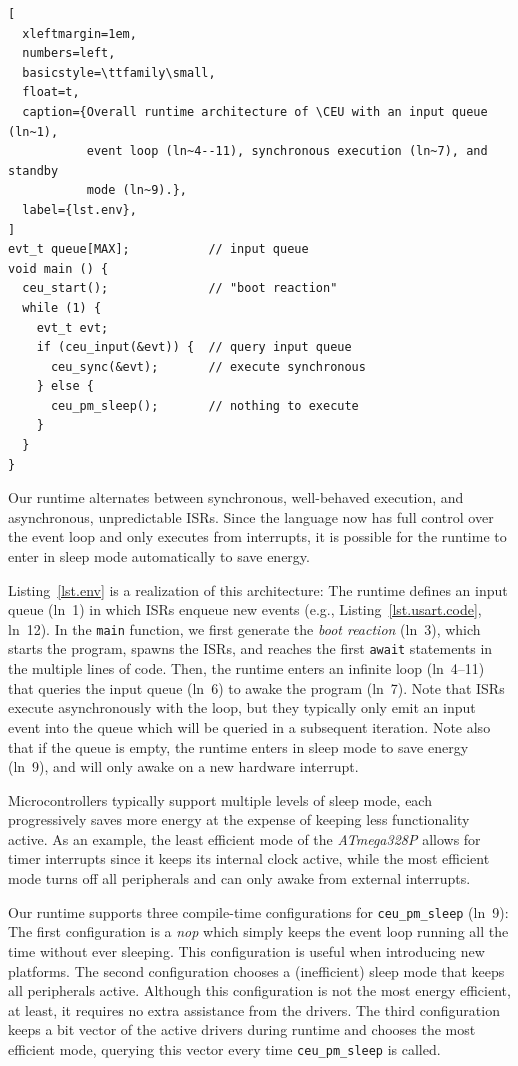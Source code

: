 \documentclass[sigplan,10pt,review,anonymous]{acmart}\settopmatter{printfolios=true,printccs=false,printacmref=false}
\newcommand{\CEU}{\textsc{C\'{e}u}\xspace}
\newcommand{\code}[1] {{\small{\texttt{#1}}}}
\begin{document}
\begin{lstlisting}[
  xleftmargin=1em,
  numbers=left,
  basicstyle=\ttfamily\small,
  float=t,
  caption={Overall runtime architecture of \CEU with an input queue (ln~1),
           event loop (ln~4--11), synchronous execution (ln~7), and standby
           mode (ln~9).},
  label={lst.env},
]
evt_t queue[MAX];           // input queue
void main () {
  ceu_start();              // "boot reaction"
  while (1) {
    evt_t evt;
    if (ceu_input(&evt)) {  // query input queue
      ceu_sync(&evt);       // execute synchronous
    } else {
      ceu_pm_sleep();       // nothing to execute
    }
  }
}
\end{lstlisting}

Our runtime
alternates between synchronous, well-behaved execution, and asynchronous,
unpredictable ISRs.
%
Since the language now has full control over the event loop and only executes
from interrupts, it is possible for the runtime to enter in sleep mode
automatically to save energy.

Listing~\ref{lst.env} is a realization of this architecture:
%
The runtime defines an input queue (ln~1) in which ISRs enqueue new events
(e.g., Listing~\ref{lst.usart.code}, ln~12).
%
In the \code{main} function, we first generate the \emph{boot reaction} (ln~3),
which starts the program, spawns the ISRs, and reaches the first \code{await}
statements in the multiple lines of code.
%
Then, the runtime enters an infinite loop (ln~4--11) that queries the input
queue (ln~6) to awake the program (ln~7).
%
Note that ISRs execute asynchronously with the loop, but they typically only
emit an input event into the queue which will be queried in a subsequent
iteration.
%
Note also that if the queue is empty, the runtime enters in sleep mode to save
energy (ln~9), and will only awake on a new hardware interrupt.

Microcontrollers typically support multiple levels of sleep mode, each
progressively saves more energy at the expense of keeping less functionality
active.
%
As an example, the least efficient mode of the \emph{ATmega328P} allows for
timer interrupts since it keeps its internal clock active, while the most
efficient mode turns off all peripherals and can only awake from external
interrupts.

Our runtime supports three compile-time configurations for \code{ceu\_pm\_sleep}
(ln~9):
%
The first configuration is a \emph{nop} which simply keeps the event loop
running all the time without ever sleeping.
This configuration is useful when introducing new platforms.
%
The second configuration chooses a (inefficient) sleep mode that keeps all
peripherals active.
Although this configuration is not the most energy efficient, at least, it
requires no extra assistance from the drivers.
%
The third configuration keeps a bit vector of the active drivers during runtime
and chooses the most efficient mode, querying this vector every time
\code{ceu\_pm\_sleep} is called.
\end{document}
